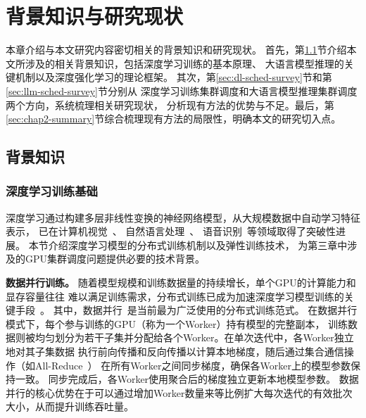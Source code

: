 
\chapter{背景知识与研究现状}\label{chap:related-work}

本章介绍与本文研究内容密切相关的背景知识和研究现状。
首先，第\ref{sec:related-tech}节介绍本文所涉及的相关背景知识，包括深度学习训练的基本原理、
大语言模型推理的关键机制以及深度强化学习的理论框架。
其次，第\ref{sec:dl-sched-survey}节和第\ref{sec:llm-sched-survey}节分别从
深度学习训练集群调度和大语言模型推理集群调度两个方向，系统梳理相关研究现状，
分析现有方法的优势与不足。最后，第\ref{sec:chap2-summary}节综合梳理现有方法的局限性，明确本文的研究切入点。

\section{背景知识}\label{sec:related-tech}

\subsection{深度学习训练基础}\label{subsec:dl-training-basics}

深度学习通过构建多层非线性变换的神经网络模型，从大规模数据中自动学习特征表示，
已在计算机视觉~\cite{krizhevsky2012imagenet,dosovitskiy2020image}、
自然语言处理~\cite{sutskever2014sequence,bahdanau2014neural}、
语音识别~\cite{hinton2012deep,chan2016listen}等领域取得了突破性进展。
本节介绍深度学习模型的分布式训练机制以及弹性训练技术，
为第三章中涉及的GPU集群调度问题提供必要的技术背景。


\textbf{数据并行训练。}
随着模型规模和训练数据量的持续增长，单个GPU的计算能力和显存容量往往
难以满足训练需求，分布式训练已成为加速深度学习模型训练的关键手段~\cite{sergeev2018horovod,li2020pytorch}。
其中，数据并行~\cite{li2014scaling}是当前最为广泛使用的分布式训练范式。
在数据并行模式下，每个参与训练的GPU（称为一个Worker）持有模型的完整副本，
训练数据则被均匀划分为若干子集并分配给各个Worker。在单次迭代中，各Worker独立地对其子集数据
执行前向传播和反向传播以计算本地梯度，随后通过集合通信操作（如All-Reduce~\cite{thakur2005optimization, sergeev2018horovod}）
在所有Worker之间同步梯度，确保各Worker上的模型参数保持一致。
同步完成后，各Worker使用聚合后的梯度独立更新本地模型参数。
数据并行的核心优势在于可以通过增加Worker数量来等比例扩大每次迭代的有效批次大小，从而提升训练吞吐量。

